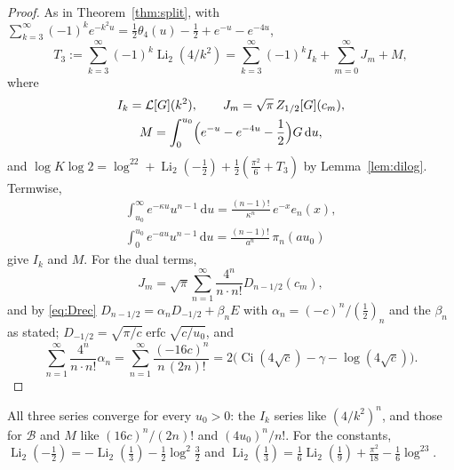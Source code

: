 \documentclass[11pt,reqno]{amsart}
\theoremstyle{definition}
\theoremstyle{remark}
\newcommand{\erfc}{\operatorname{erfc}}
\newcommand{\Ci}{\operatorname{Ci}}
\newcommand{\Li}{\operatorname{Li}}
\newcommand{\dd}{\,\mathrm{d}}
\begin{document}
\begin{proof}
As in Theorem~\ref{thm:split}, with
$\sum_{k=3}^{\infty}(-1)^ke^{-k^2u} = \frac12\theta_4(u) - \frac12 + e^{-u} - e^{-4u}$,
\[
  T_3 := \sum_{k=3}^{\infty}(-1)^k\Li_2(4/k^2) = \sum_{k=3}^{\infty}(-1)^k I_k + \sum_{m=0}^{\infty} J_m + M,
\]
where
\begin{gather*}
  I_k = \mathcal L[G](k^2), \qquad J_m = \sqrt\pi\,Z_{1/2}[G](c_m), \\
  M = \int_0^{u_0}\Bigl(e^{-u} - e^{-4u} - \frac12\Bigr)G\dd u,
\end{gather*}
and $\log K\log2 = \log^22 + \Li_2(-\frac12) + \frac12(\frac{\pi^2}6 + T_3)$ by Lemma~\ref{lem:dilog}. Termwise,
\begin{gather*}
  \int_{u_0}^\infty e^{-\kappa u}u^{n-1}\dd u = \frac{(n-1)!}{\kappa^n}\,e^{-x}e_n(x), \\
  \int_0^{u_0}e^{-au}u^{n-1}\dd u = \frac{(n-1)!}{a^n}\,\pi_n(au_0)
\end{gather*}
give $I_k$ and $M$. For the dual terms,
\[
  J_m = \sqrt\pi\sum_{n=1}^{\infty}\frac{4^n}{n\cdot n!}D_{n-1/2}(c_m),
\]
and by \eqref{eq:Drec} $D_{n-1/2} = \alpha_nD_{-1/2} + \beta_nE$ with $\alpha_n = (-c)^n/(\frac12)_n$ and the $\beta_n$
as stated; $D_{-1/2} = \sqrt{\pi/c}\erfc\sqrt{c/u_0}$, and
\[
  \sum_{n=1}^{\infty}\frac{4^n}{n\cdot n!}\alpha_n = \sum_{n=1}^{\infty}\frac{(-16c)^n}{n\,(2n)!}
  = 2\bigl(\Ci(4\sqrt c) - \gamma - \log(4\sqrt c)\bigr).
\]
\end{proof}

All three series converge for every $u_0 > 0$: the $I_k$ series like $(4/k^2)^n$, and those for $\mathcal B$ and $M$
like $(16c)^n/(2n)!$ and $(4u_0)^n/n!$. For the constants, $\Li_2(-\frac12) = -\Li_2(\frac13) - \frac12\log^2\frac32$
and $\Li_2(\frac13) = \frac16\Li_2(\frac19) + \frac{\pi^2}{18} - \frac16\log^23$.
\end{document}
